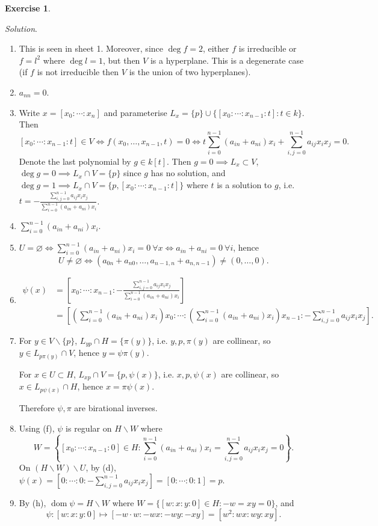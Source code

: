 \documentclass{article}
\newcommand{\dom}{\operatorname{dom}}
\theoremstyle{definition}
\newtheorem{exe}[defn]{Exercise}
\begin{document}
\begin{exe}
\begin{enumerate}
\textit{Solution}. \begin{enumerate}
\item This is seen in sheet 1. Moreover, since $\deg f=2$, either $f$ is irreducible or $f=l^2$ where $\deg l=1$, but then $V$ is a hyperplane. This is a degenerate case (if $f$ is not irreducible then $V$ is the union of two hyperplanes).
\item $a_{nn}=0$.
\item Write $x=[x_0:\cdots:x_n]$ and parameterise $L_x=\{p\}\cup\{[x_0:\cdots:x_{n-1}:t]:t\in k\}$. Then
\[
[x_0:\cdots:x_{n-1}:t]\in V\iff f(x_0,\ldots,x_{n-1},t)=0\iff t\sum_{i=0}^{n-1}(a_{in}+a_{ni})x_i+\sum_{i,j=0}^{n-1}a_{ij}x_ix_j=0.
\]
Denote the last polynomial by $g\in k[t]$. Then $g=0\implies L_x\subset V$, $\deg g=0\implies L_x\cap V=\{p\}$ since $g$ has no solution, and $\deg g=1\implies L_x\cap V=\{p,[x_0:\cdots:x_{n-1}:t]\}$ where $t$ is a solution to $g$, i.e. $t=-\frac{\sum_{i,j=0}^{n-1}a_{ij}x_ix_j}{\sum_{i=0}^{n-1}(a_{in}+a_{ni})x_i}$.
\item $\sum_{i=0}^{n-1}(a_{in}+a_{ni})x_i$.
\item $U=\varnothing\iff\sum_{i=0}^{n-1}(a_{in}+a_{ni})x_i=0 \ \forall x\iff a_{in}+a_{ni}=0 \ \forall i$, hence
\[
U\neq\varnothing\iff (a_{0n}+a_{n0},\ldots,a_{n-1,n}+a_{n,n-1})\neq (0,\ldots,0).
\]
\item \[
\begin{aligned}
\psi(x)&=\left[x_0:\cdots:x_{n-1}:-\frac{\sum_{i,j=0}^{n-1}a_{ij}x_ix_j}{\sum_{i=0}^{n-1}(a_{in}+a_{ni})x_i}\right]\\
&=\left[\left(\sum_{i=0}^{n-1}(a_{in}+a_{ni})x_i\right)x_0:\cdots:\left(\sum_{i=0}^{n-1}(a_{in}+a_{ni})x_i\right)x_{n-1}:-\sum_{i,j=0}^{n-1}a_{ij}x_ix_j \right].
\end{aligned}
\]
\item For $y\in V\backslash\{p\}$, $L_{yp}\cap H=\{\pi(y)\}$, i.e. $y,p,\pi(y)$ are collinear, so $y\in L_{p\pi(y)}\cap V$, hence $y=\psi\pi(y)$.

For $x\in U\subset H$, $L_{xp}\cap V=\{p,\psi(x)\}$, i.e. $x,p,\psi(x)$ are collinear, so $x\in L_{p\psi(x)}\cap H$, hence $x=\pi\psi(x)$.

Therefore $\psi,\pi$ are birational inverses.
\item Using (f), $\psi$ is regular on $H\backslash W$ where
\[
W=\left\{[x_0:\cdots:x_{n-1}:0]\in H:\sum_{i=0}^{n-1}(a_{in}+a_{ni})x_i=\sum_{i,j=0}^{n-1}a_{ij}x_ix_j=0\right\}.
\]
On $(H\backslash W)\backslash U$, by (d), $\psi(x)=\left[0:\cdots:0:-\sum_{i,j=0}^{n-1}a_{ij}x_ix_j\right]=[0:\cdots:0:1]=p$.
\item By (h), $\dom\psi=H\backslash W$ where $W=\{[w:x:y:0]\in H:-w=xy=0\}$, and
\[
\psi:[w:x:y:0]\mapsto [-w\cdot w:-wx:-wy:-xy]=[w^2:wx:wy:xy].
\]


\end{enumerate}
\end{enumerate}
\end{exe}
\end{document}
